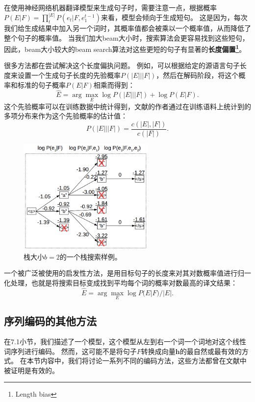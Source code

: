 \documentclass[10pt,a4paper]{ctexart}
\begin{document}
在使用神经网络机器翻译模型来生成句子时，需要注意一点，根据概率$P(E|F) = \prod_t^{|E|}P(e_t | F,e_1^{t-1})$来看，模型会倾向于生成短句。
这是因为，每次我们给生成结果中加入另一个词时，其概率值都会被乘以一个概率值，从而降低了整个句子的概率值。
当我们加大beam大小时，搜索算法会更容易找到这些短句，因此，beam大小较大的beam search算法对这些更短的句子有显著的\textbf{长度偏置\footnote{Length bias}}。

很多方法都在尝试解决这个长度偏执问题。
例如，可以根据给定的源语言句子长度来设置一个生成句子长度的先验概率$P(|E| | |F|)$，然后在解码阶段，将这个概率和标准的句子概率$P(E | F)$相乘而得到\cite{eriguchi2016tree}：
\begin{equation}\label{eq:61}
 \hat{E} = \arg \max \limits_{E} \log P(|E|||F|) + \log P(E|F).
\end{equation}
这个先验概率可以在训练数据中统计得到，文献\cite{eriguchi2016tree}的作者通过在训练语料上统计到的多项分布来作为这个先验概率的估计值：
\begin{equation}\label{eq:62}
 P(|E|||F|) = \frac{c(|E|,|F|)}{c(|F|)}.
\end{equation}

\begin{figure}[H]
\centering
\includegraphics[width=0.6\textwidth]{fig23.png}
\caption{栈大小$b=2$的一个栈搜索样例。}
\label{fig:23}
\end{figure}
一个被广泛被使用的启发性方法，是用目标句子的长度来对其对数概率值进行归一化处理，也就是将搜索目标变成找到平均每个词的概率对数最高的译文结果\cite{cho2014properties}：
\begin{equation}\label{eq:63}
 \hat{E} = \arg \max \limits_{E} \log P(E|F)/|E|.
\end{equation}

\subsection{序列编码的其他方法}
在7.1小节，我们描述了一个模型，这个模型从左到右一个词一个词地对这个线性词序列进行编码。
然而，这可能不是将句子$F$转换成向量$\textbf{h}$的最自然或最有效的方式。
在本节内容中，我们将讨论一系列不同的编码方法，这些方法都曾在文献中被证明是有效的。
\end{document}
